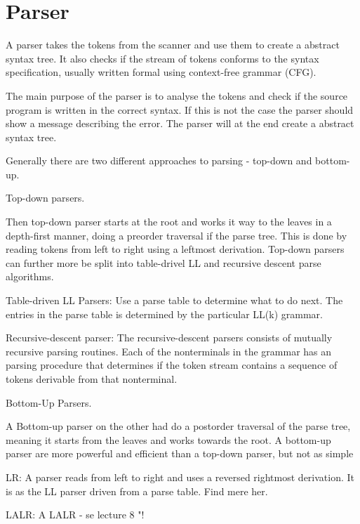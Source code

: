 \section{Parser}
A parser takes the tokens from the scanner and use them to create a abstract syntax tree. It also checks if the stream of tokens conforms to the syntax specification, usually written formal using context-free grammar (CFG).


The main purpose of the parser is to analyse the tokens and check if the source program is written in the correct syntax. If this is not the case the parser should show a message describing the error. The parser will at the end create a abstract syntax tree. 

Generally there are two different approaches to parsing - top-down and bottom-up.

Top-down parsers.

Then top-down parser starts at the root and works it way to the leaves in a depth-first manner, doing a preorder traversal if the parse tree.  This is done by reading tokens from left to right using a leftmost derivation. Top-down parsers can further more be split into table-drivel LL  and recursive descent parse algorithms.

Table-driven LL Parsers:
Use a parse table to determine what to do next. The entries in the parse table is determined by the particular LL(k) grammar.

Recursive-descent parser:
The recursive-descent parsers consists of mutually recursive parsing routines. Each of the nonterminals in the grammar has an parsing procedure that determines if the token stream contains a sequence of tokens derivable from that nonterminal.

Bottom-Up Parsers.

A Bottom-up parser on the other had do a postorder traversal of the parse tree, meaning it starts from the leaves and works towards the root.
A bottom-up parser are more powerful and efficient than a top-down parser, but not as simple

LR:
A parser reads from left to right and uses a reversed rightmost derivation. It is as the LL parser driven from a parse table. Find mere her.

LALR:
A LALR - se lecture 8 "!